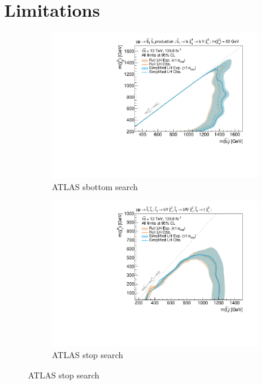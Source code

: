 \section{Limitations}\label{sec:simplify_limitations}

\begin{figure}
	\centering
	\begin{subfigure}[b]{0.5\textwidth}
		\centering\includegraphics[width=\textwidth]{exclusion_sbottom_noLabel_v3}
		\caption{ATLAS sbottom search~\cite{SUSY-2018-31}\label{fig:results_sbottom}}
	\end{subfigure}\hfill
	\begin{subfigure}[b]{0.5\textwidth}
		\centering\includegraphics[width=\textwidth]{exclusion_stop1L_noLabel_v3}
		\caption{ATLAS stop search~\cite{SUSY-2018-07}\label{fig:results_stop1L}}

\end{subfigure}
\end{figure}
